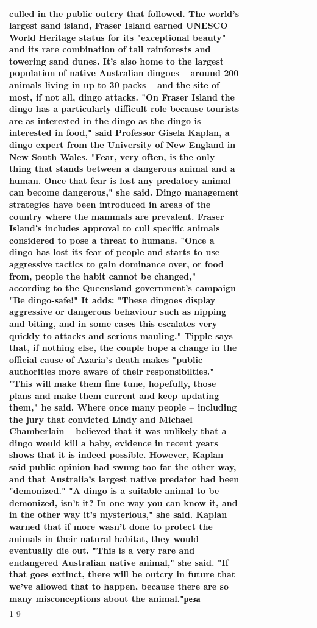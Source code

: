 \begin{table}[H]
\begin{tabular}{lllrlllll}
culled in the public outcry that followed. The world's largest sand island, Fraser Island earned UNESCO World Heritage status for its "exceptional beauty" and its rare combination of tall rainforests and towering sand dunes. It's also home to the largest population of native Australian dingoes -- around 200 animals living in up to 30 packs -- and the site of most, if not all, dingo attacks. "On Fraser Island the dingo has a particularly difficult role because tourists are as interested in the dingo as the dingo is interested in food," said Professor Gisela Kaplan, a dingo expert from the University of New England in New South Wales. "Fear, very often, is the only thing that stands between a dangerous animal and a human. Once that fear is lost any predatory animal can become dangerous," she said. Dingo management strategies have been introduced in areas of the country where the mammals are prevalent. Fraser Island's includes approval to cull specific animals considered to pose a threat to humans. "Once a dingo has lost its fear of people and starts to use aggressive tactics to gain dominance over, or food from, people the habit cannot be changed," according to the Queensland government's campaign "Be dingo-safe!" It adds: "These dingoes display aggressive or dangerous behaviour such as nipping and biting, and in some cases this escalates very quickly to attacks and serious mauling." Tipple says that, if nothing else, the couple hope a change in the official cause of Azaria's death makes "public authorities more aware of their responsibilties." "This will make them fine tune, hopefully, those plans and make them current and keep updating them," he said. Where once many people -- including the jury that convicted Lindy and Michael Chamberlain -- believed that it was unlikely that a dingo would kill a baby, evidence in recent years shows that it is indeed possible. However, Kaplan said public opinion had swung too far the other way, and that Australia's largest native predator had been "demonized." "A dingo is a suitable animal to be demonized, isn't it? In one way you can know it, and in the other way it's mysterious," she said. Kaplan warned that if more wasn't done to protect the animals in their natural habitat, they would eventually die out. "This is a very rare and endangered Australian native animal," she said. "If that goes extinct, there will be outcry in future that we've allowed that to happen, because there are so many misconceptions about the animal."реза \\
\cline{1-9}

\end{tabular}
\end{table}
